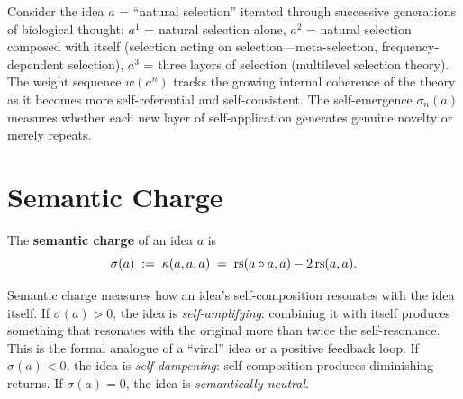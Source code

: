\begin{example}
Consider the idea $a$ = ``natural selection'' iterated through successive
generations of biological thought: $a^1$ = natural selection alone,
$a^2$ = natural selection composed with itself (selection acting on
selection---meta-selection, frequency-dependent selection), $a^3$ =
three layers of selection (multilevel selection theory). The weight
sequence $w(a^n)$ tracks the growing internal coherence of the theory
as it becomes more self-referential and self-consistent. The
self-emergence $\sigma_n(a)$ measures whether each new layer of
self-application generates genuine novelty or merely repeats.
\end{example}

\section{Semantic Charge}

\begin{definition}\label{def:semantic-charge}
The \textbf{semantic charge} of an idea $a$ is
\[
    \sigma(a) \;:=\; \kappa(a, a, a) \;=\;
    \mathrm{rs}(a \circ a, a) - 2\,\mathrm{rs}(a, a).
\]
\end{definition}

\begin{interpretation}
Semantic charge measures how an idea's self-composition resonates with the
idea itself. If $\sigma(a) > 0$, the idea is \emph{self-amplifying}:
combining it with itself produces something that resonates with the
original more than twice the self-resonance. This is the formal analogue
of a ``viral'' idea or a positive feedback loop. If $\sigma(a) < 0$, the
idea is \emph{self-dampening}: self-composition produces diminishing
returns. If $\sigma(a) = 0$, the idea is \emph{semantically neutral}.
\end{interpretation}

